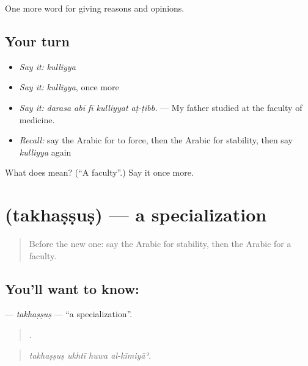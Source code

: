 \begin{grammarlens}[title={What you've built}]
One more word for giving reasons and opinions.
\end{grammarlens}

\subsection*{Your turn}
\begin{itemize}
\raggedright
  \item \emph{Say it:} \emph{kulliyya}
  \item \emph{Say it:} \emph{kulliyya}, once more
  \item \emph{Say it:} \emph{darasa abī fī kulliyyat aṭ-ṭibb.} — My father studied at the faculty of medicine.
  \item \emph{Recall:} say the Arabic for to force, then the Arabic for stability, then say \emph{kulliyya} again
\end{itemize}

\begin{tcolorbox}[breakable,colback=teal!4,colframe=teal!35!black,title={Before you move on}]
What does  mean? (\textquotedblleft{}A faculty\textquotedblright{}.) Say it once more.
\end{tcolorbox}
\section[\texorpdfstring{\ar{تخصص} (takhaṣṣuṣ)}{تخصص (takhaṣṣuṣ)}]{ (takhaṣṣuṣ) — a specialization}

\label{lesson:AR-C390-takhassus}



\begin{quote}
Before the new one: say the Arabic for stability, then the Arabic for a faculty.
\end{quote}

\subsection*{You'll want to know: }
\textbf{} — \emph{takhaṣṣuṣ} — \textquotedblleft{}a specialization\textquotedblright{}.

\begin{quote}
   .
\end{quote}

\begin{quote}
\emph{takhaṣṣuṣ ukhtī huwa al-kīmiyāʾ.}
\end{quote}


